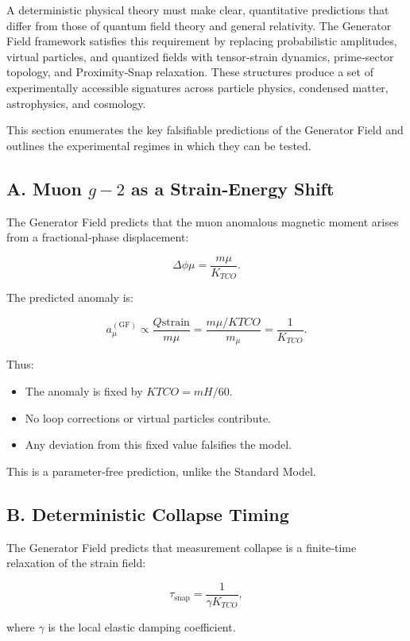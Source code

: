 \documentclass[reprint,amsmath,amssymb,aps,prl,floatfix]{revtex4-2}
\begin{document}
\begin{itemize}
A deterministic physical theory must make clear, quantitative predictions that differ from those of quantum field theory and general relativity. The Generator Field framework satisfies this requirement by replacing probabilistic amplitudes, virtual particles, and quantized fields with tensor‑strain dynamics, prime‑sector topology, and Proximity‑Snap relaxation. These structures produce a set of experimentally accessible signatures across particle physics, condensed matter, astrophysics, and cosmology.
\medskip

This section enumerates the key falsifiable predictions of the Generator Field and outlines the experimental regimes in which they can be tested.

\subsection{A. Muon \(g-2\) as a Strain‑Energy Shift}

The Generator Field predicts that the muon anomalous magnetic moment arises from a fractional‑phase displacement:

\[
\Delta\phi\mu = \frac{m\mu}{K_{TCO}}.
\]

The predicted anomaly is:

\[
a_\mu^{(\mathrm{GF})}
\propto
\frac{Q{\mathrm{strain}}}{m\mu}
=
\frac{m\mu/K{TCO}}{m_\mu}
=
\frac{1}{K_{TCO}}.
\]

Thus:

\begin{itemize}
\item The anomaly is fixed by \(K{TCO} = mH/60\).  
\item No loop corrections or virtual particles contribute.  
\item Any deviation from this fixed value falsifies the model.
\end{itemize}

This is a parameter‑free prediction, unlike the Standard Model.

\subsection{B. Deterministic Collapse Timing}

The Generator Field predicts that measurement collapse is a finite‑time relaxation of the strain field:

\[
\tau_{\mathrm{snap}}
=
\frac{1}{\gamma K_{TCO}},
\]

where \(\gamma\) is the local elastic damping coefficient.


\end{itemize}
\end{document}
